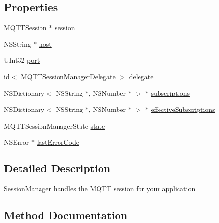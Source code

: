 \subsection*{Properties}
\begin{DoxyCompactItemize}
\item 
\hyperlink{interface_m_q_t_t_session}{M\+Q\+T\+T\+Session} $\ast$ \hyperlink{interface_m_q_t_t_session_manager_ab85b572d885a43b0faa79373a9cc6913}{session}
\item 
N\+S\+String $\ast$ \hyperlink{interface_m_q_t_t_session_manager_a9254ba4654f77ec3ff37dab05cd1d4d1}{host}
\item 
U\+Int32 \hyperlink{interface_m_q_t_t_session_manager_aba240cdc089994d549452cbaecc6af4a}{port}
\item 
id$<$ M\+Q\+T\+T\+Session\+Manager\+Delegate $>$ \hyperlink{interface_m_q_t_t_session_manager_abc07e05f3c0593b0bd851e8d69255381}{delegate}
\item 
N\+S\+Dictionary$<$ N\+S\+String $\ast$, N\+S\+Number $\ast$ $>$ $\ast$ \hyperlink{interface_m_q_t_t_session_manager_a58ff79b8f16b7172d6466dfe55927428}{subscriptions}
\item 
N\+S\+Dictionary$<$ N\+S\+String $\ast$, N\+S\+Number $\ast$ $>$ $\ast$ \hyperlink{interface_m_q_t_t_session_manager_a2c6507254d370d9f860b299608b37280}{effective\+Subscriptions}
\item 
M\+Q\+T\+T\+Session\+Manager\+State \hyperlink{interface_m_q_t_t_session_manager_a4caf1f5fe21b8d36700d97b68b3bf978}{state}
\item 
N\+S\+Error $\ast$ \hyperlink{interface_m_q_t_t_session_manager_aa2522a9c3be18812cea22cf2f6a40754}{last\+Error\+Code}
\end{DoxyCompactItemize}


\subsection{Detailed Description}
Session\+Manager handles the M\+Q\+TT session for your application 

\subsection{Method Documentation}
\mbox{\label{interface_m_q_t_t_session_manager_a1c0903acd31887dfa1e1d16039aa53ec}} 
